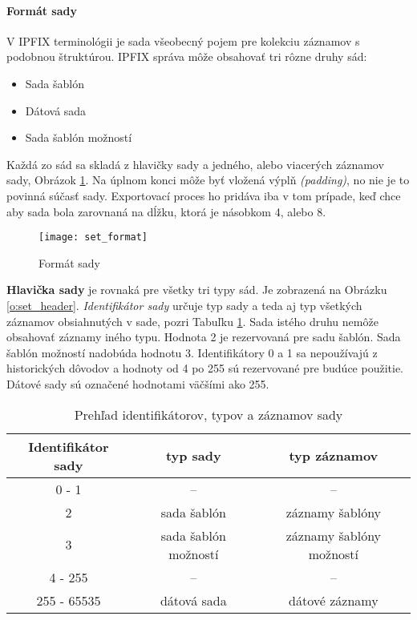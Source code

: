 \paragraph{Formát sady}

V IPFIX terminológii je sada všeobecný pojem pre kolekciu záznamov s podobnou štruktúrou. 
IPFIX správa môže obsahovať tri rôzne druhy sád:
\begin{itemize}
 \item Sada šablón
 \item Dátová sada
 \item Sada šablón možností
\end{itemize}
Každá zo sád sa skladá z hlavičky sady a jedného, alebo viacerých záznamov sady, Obrázok \ref{o:set_format}. 
Na úplnom konci môže byť vložená výplň \emph{(padding)}, no nie je to povinná súčasť sady. Exportovací proces ho pridáva 
iba v tom prípade, keď chce aby sada bola zarovnaná na dĺžku, ktorá je násobkom 4, alebo 8.

\begin{figure}[ht!]
\centering
\texttt{[image: set\_format]}
\caption{Formát sady}\label{o:set_format}
\end{figure}

\textbf{Hlavička sady} je rovnaká pre všetky tri typy sád. Je zobrazená na Obrázku \ref{o:set_header}. 
\emph{Identifikátor sady} určuje typ sady a teda aj typ všetkých záznamov obsiahnutých v sade, pozri 
Tabuľku \ref{t:set-record}. 
Sada istého druhu nemôže obsahovať záznamy iného typu. 
Hodnota 2 je rezervovaná pre sadu šablón. Sada šablón možností nadobúda 
hodnotu 3. Identifikátory 0 a 1 sa nepoužívajú z historických dôvodov \citep{rfc3954} a hodnoty od 4 po 
255 sú rezervované pre budúce použitie. Dátové sady sú označené hodnotami väčšími ako 255. 

\tabcolsep=8pt
\begin{table}[!ht]\caption{Prehľad identifikátorov, typov a záznamov sady}\label{t:set-record}
\smallskip
\centering
\begin{tabular}{|c|c|c|}
\hline
\textbf{Identifikátor sady} & \textbf{typ sady} & \textbf{typ záznamov} \\ \hline
0 - 1 & -- & -- \\ \hline
2 & sada šablón & záznamy šablóny \\ \hline
3 & sada šablón možností & záznamy šablóny možností \\ \hline
4 - 255 & -- & -- \\ \hline
255 - 65535 & dátová sada & dátové záznamy \\ \hline
\end{tabular}
\end{table}

